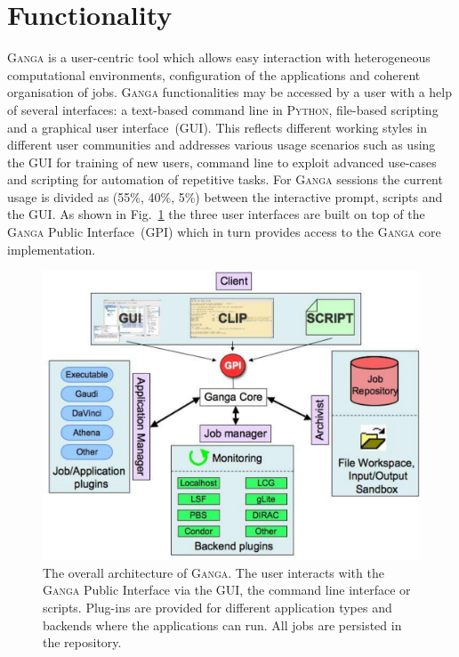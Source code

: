 \documentclass{elsart}
\def\ganga {\textsc{Ganga}\xspace}
\def\python {\textsc{Python}\xspace}
\def\GPI{GPI\xspace}
\begin{document}
\section{Functionality}
\label{sec:functionality}
\ganga is a user-centric tool which allows easy interaction with heterogeneous
computational environments, configuration of the applications and coherent
organisation of jobs. \ganga functionalities may be accessed by a user with a
help of several interfaces: a text-based command line in \python, file-based
scripting and a graphical user interface~(GUI). This reflects different
working styles in different user communities and addresses various usage
scenarios such as using the GUI for training of new users, command line to
exploit advanced use-cases and scripting for automation of repetitive tasks.
For \ganga sessions the current usage is divided as (55\%, 40\%, 5\%) between
the interactive prompt, scripts and the GUI. As shown in
Fig.~\ref{fig:GPI_architecture} the three user interfaces are built on top of
the \ganga Public Interface~(\GPI) which in turn provides access to the \ganga
core implementation.
\begin{figure}[htbp]
  \centering
  \includegraphics[width=14cm]{GangaOverview.pdf}
  \caption{The overall architecture of \ganga. The user interacts with the
    \ganga Public Interface via the GUI, the command line interface or
    scripts. Plug-ins are provided for different application types and
    backends where the applications can run. All jobs are persisted in the
    repository.}
  \label{fig:GPI_architecture}
\end{figure}
\end{document}
